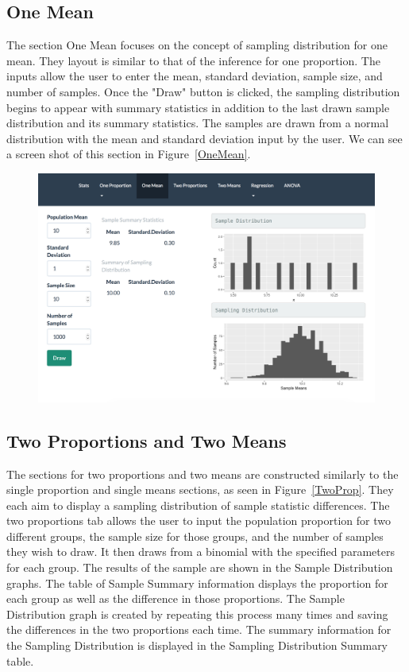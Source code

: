 \documentclass[11pt]{book}
\begin{document}
\subsection{One Mean}
The section One Mean focuses on the concept of sampling distribution for one mean. They layout is similar to that of the inference for one proportion.  The inputs allow the user to enter the mean, standard deviation, sample size, and number of samples.  Once the "Draw" button is clicked, the sampling distribution begins to appear with summary statistics in addition to the last drawn sample distribution and its summary statistics. The samples are drawn from a normal distribution with the mean and standard deviation input by the user.   We can see a screen shot of this section in Figure~\ref{OneMean}.


\begin{figure}[H]
\centering
        \includegraphics[width=\textwidth]{OneMean.png}
        \label{fig: OneMean}
\end{figure}

\subsection{Two Proportions and Two Means}

The sections for two proportions and two means are constructed similarly to the single proportion and single means sections, as seen in Figure~\ref{TwoProp}.  They each aim to display a sampling distribution of sample statistic differences. The two proportions tab allows the user to input the population proportion for two different groups, the sample size for those groups, and the number of samples they wish to draw. It then draws from a binomial with the specified parameters for each group. The results of the sample are shown in the Sample Distribution graphs. The table of Sample Summary information displays the proportion for each group as well as the difference in those proportions. The Sample Distribution graph is created by repeating this process many times and saving the differences in the two proportions each time. The summary information for the Sampling Distribution is displayed in the Sampling Distribution Summary table.
\end{document}
